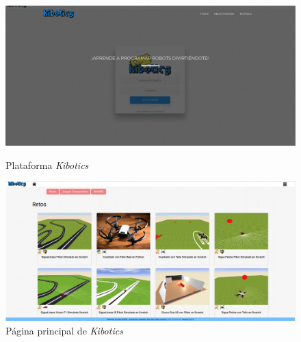 \begin{figure}[!htb]
    \includegraphics[width=\linewidth]{figures/introduccion/kibotics1.png}
    \caption{Plataforma \textit{Kibotics}}\label{fig:inKib1}
\endminipage\hfill
{}
    \includegraphics[width=\linewidth]{figures/introduccion/kibotics2.png}
    \caption{Página principal de \textit{Kibotics}}\label{fig:inKib2}
\endminipage\hfill
\end{figure}


